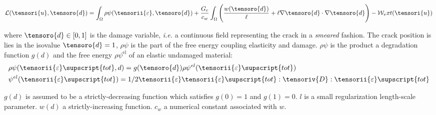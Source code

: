 \begin{equation}
    \label{Bourdin_Lagrangian}
    \begin{aligned}
        \mathcal{L}(\tensori{u},\tensoro{d})
        =
        \int_{\Omega} \rho \psi(\tensorii{\varepsilon}, \tensoro{d})
        +
        \frac{G_c}{c_w} \int_{\Omega}
        \Bigg(
            \frac{w(\tensoro{d})}{\ell}
            +
            \ell \nabla \tensoro{d} \cdot \nabla \tensoro{d}
        \Bigg)
        -
        \mathcal{W}_ext(\tensori{u})
    \end{aligned}
\end{equation}


where $\tensoro{d} \in [0,1]$ is the damage variable, \textit{i.e.} a continuous field
representing the crack in a \textit{smeared} fashion. The crack position is
lies in the isovalue $\tensoro{d} = 1$, $\rho\psi$ is the part of the free energy coupling elasticity and
damage. $\rho\psi$ is the product a degradation function
$g(d)$ and the free energy $\rho\psi^{\mathrm{el}}$ of an
elastic undamaged material:
\begin{equation}
    \begin{aligned}
        & \rho \psi (\tensorii{\varepsilon}\supscript{tot},d)
        =
        g(\tensoro{d}) \rho \psi^{el}(\tensorii{\varepsilon}\supscript{tot})
        \\
        & \psi^{el}(\tensorii{\varepsilon}\supscript{tot})
        =
        1/2 \tensorii{\varepsilon}\tensorii{\varepsilon}\supscript{tot} : \tensoriv{D} : \tensorii{\varepsilon}\supscript{tot}
    \end{aligned}
\end{equation}

$g(d)$ is assumed to be a strictly-decreasing function which satisfies
$g(0)=1$ and $g(1)=0$.
$l$ is a small regularization length-scale parameter.
$w(d)$ a strictly-increasing function.
$c_w$ a numerical constant associated with $w$.


